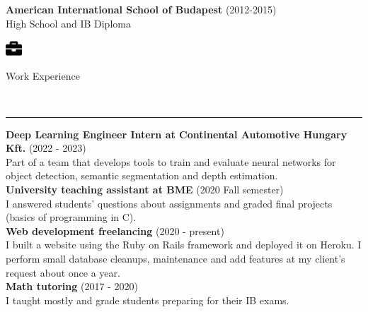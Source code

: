 \documentclass{article}
\begin{document}
\noindent
\textbf{American International School of Budapest} \hspace{3mm} \color{gray} (2012-2015) \color{black} \\
High School and IB Diploma
\smallskip \\

\noindent
\begin{minipage}[c]{7mm}
    \includegraphics[width=6mm]{../images/briefcase-solid.pdf}
\end{minipage}
\begin{minipage}[c]{100mm}
    {\large{Work Experience}}
\end{minipage} \\
\hrule
\bigskip

\noindent
\textbf{Deep Learning Engineer Intern at Continental Automotive Hungary Kft.} \hspace{3mm} \color{gray} (2022 - 2023) \color{black} \\
Part of a team that develops tools to train and evaluate neural networks for object detection, semantic segmentation and depth estimation.
\smallskip \\

\noindent
\textbf{University teaching assistant at BME} \hspace{3mm} \color{gray} (2020 Fall semester) \color{black} \\
I answered students' questions about assignments and graded final projects (basics of programming in C).
\smallskip \\

\noindent
\textbf{Web development freelancing} \hspace{3mm} \color{gray} (2020 - present) \color{black} \\
I built a website using the Ruby on Rails framework and deployed it on Heroku. I perform small database cleanups, maintenance and add features at my client's request about once a year.
\smallskip \\


\noindent
\textbf{Math tutoring} \hspace{3mm} \color{gray} (2017 - 2020) \color{black} \\
I taught mostly  and  grade students preparing for their IB exams.
\smallskip \\
\end{document}
